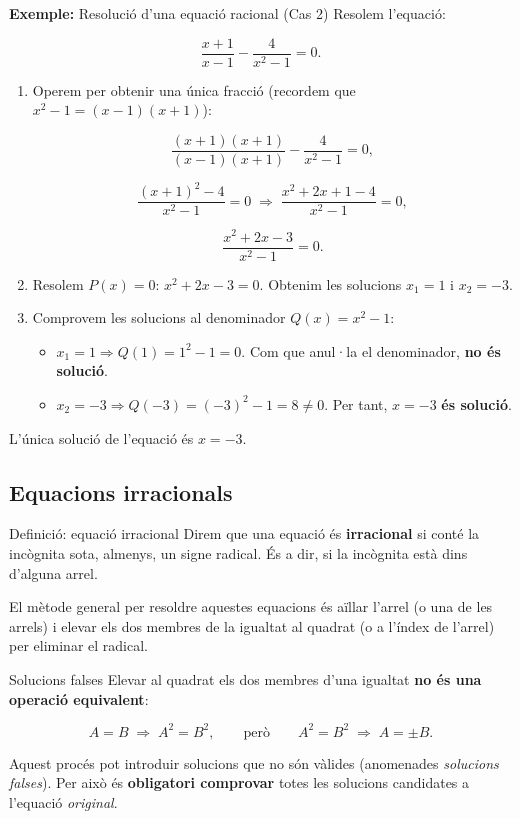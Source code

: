 \begin{exemple}{\textbf{Exemple:} Resolució d'una equació racional (Cas 2)}
Resolem l'equació:

\[
\frac{x+1}{x-1}-\frac{4}{x^2-1}=0.
\]

\begin{enumerate}
\item Operem per obtenir una única fracció (recordem que $x^2-1 = (x-1)(x+1)$):

\[
\frac{(x+1)(x+1)}{(x-1)(x+1)} - \frac{4}{x^2-1} = 0,
\]

\[
\frac{(x+1)^2-4}{x^2-1} = 0 \;\Rightarrow\; \frac{x^2+2x+1-4}{x^2-1} = 0,
\]

\[
\frac{x^2+2x-3}{x^2-1} = 0.
\]
\item Resolem $P(x)=0$: $x^2+2x-3=0$. Obtenim les solucions $x_1=1$ i $x_2=-3$.
\item Comprovem les solucions al denominador $Q(x)=x^2-1$:

\begin{itemize}
\item $x_1=1 \Rightarrow Q(1) = 1^2-1 = 0$. Com que anul·la el denominador, \textbf{no és solució}.
\item $x_2=-3 \Rightarrow Q(-3) = (-3)^2-1 = 8 \neq 0$. Per tant, $x=-3$ \textbf{és solució}.
\end{itemize}
\end{enumerate}

L'única solució de l'equació és $x=-3$.
\end{exemple}

\subsection{Equacions irracionals}

\begin{definicio}{Definició: equació irracional}
Direm que una equació és \textbf{irracional} si conté la incògnita sota, almenys, un signe radical. És a dir, si la incògnita està dins d'alguna arrel.
\end{definicio}

El mètode general per resoldre aquestes equacions és aïllar l'arrel (o una de les arrels) i elevar els dos membres de la igualtat al quadrat (o a l'índex de l'arrel) per eliminar el radical.

\begin{nota}{Solucions falses}
Elevar al quadrat els dos membres d'una igualtat \textbf{no és una operació equivalent}:

\[
A=B \;\Rightarrow\; A^2=B^2, \qquad \text{però} \qquad A^2=B^2 \;\Rightarrow\; A=\pm B.
\]

Aquest procés pot introduir solucions que no són vàlides (anomenades \emph{solucions falses}). Per això és \textbf{obligatori comprovar} totes les solucions candidates a l'equació \emph{original}.
\end{nota}

